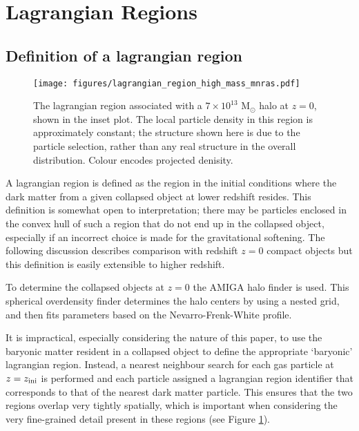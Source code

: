 \section{Lagrangian Regions}
\label{sec:lagrangianregions}

\subsection{Definition of a lagrangian region}

\begin{figure}
    \centering
    \texttt{[image: figures/lagrangian\_region\_high\_mass\_mnras.pdf]}
    \caption{The lagrangian region associated with a $7\times10^{13}$
	$\mathrm{M}_\odot$ halo at $z=0$, shown in the inset plot. The local
	particle density in this region is approximately constant; the
	structure shown here is due to the particle selection, rather than any
	real structure in the overall distribution. Colour encodes projected
	denisity.}
    \label{fig:lrpic}
\end{figure}

A lagrangian region is defined as the region in the initial conditions where
the dark matter from a given collapsed object at lower redshift resides. This
definition is somewhat open to interpretation; there may be particles enclosed
in the convex hull of such a region that do not end up in the collapsed object,
especially if an incorrect choice is made for the gravitational softening. The
following discussion describes comparison with redshift $z=0$ compact objects
but this definition is easily extensible to higher redshift.

To determine the collapsed objects at $z=0$ the AMIGA halo finder
\citep[AHF][]{ahfi, ahfii} is used. This spherical overdensity finder
determines the halo centers by using a nested grid, and then fits parameters
based on the Nevarro-Frenk-White \citep[NFW, ][]{nfw} profile.

It is impractical, especially considering the nature of this paper, to use the
baryonic matter resident in a collapsed object to define the appropriate
`baryonic' lagrangian region. Instead, a nearest neighbour search for each gas
particle at $z=z_{\rm ini}$ is performed and each particle assigned a
lagrangian region identifier that corresponds to that of the nearest dark
matter particle. This ensures that the two regions overlap very tightly
spatially, which is important when considering the very fine-grained detail
present in these regions (see Figure \ref{fig:lrpic}).

